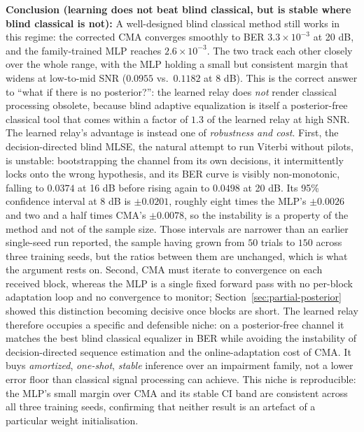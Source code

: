 \textbf{Conclusion (learning does not beat blind classical, but is stable where blind classical is not):} A well-designed blind classical method still works in this regime: the corrected CMA converges smoothly to BER $3.3\times10^{-3}$ at 20 dB, and the family-trained MLP reaches $2.6\times10^{-3}$. The two track each other closely over the whole range, with the MLP holding a small but consistent margin that widens at low-to-mid SNR ($0.0955$ vs.\ $0.1182$ at 8 dB). This is the correct answer to ``what if there is no posterior?'': the learned relay does \emph{not} render classical processing obsolete, because blind adaptive equalization is itself a posterior-free classical tool that comes within a factor of $1.3$ of the learned relay at high SNR. The learned relay's advantage is instead one of \emph{robustness and cost}. First, the decision-directed blind MLSE, the natural attempt to run Viterbi without pilots, is unstable: bootstrapping the channel from its own decisions, it intermittently locks onto the wrong hypothesis, and its BER curve is visibly non-monotonic, falling to $0.0374$ at 16 dB before rising again to $0.0498$ at 20 dB. Its 95\% confidence interval at 8 dB is $\pm0.0201$, roughly eight times the MLP's $\pm0.0026$ and two and a half times CMA's $\pm0.0078$, so the instability is a property of the method and not of the sample size. Those intervals are narrower than an earlier single-seed run reported, the sample having grown from $50$ trials to $150$ across three training seeds, but the ratios between them are unchanged, which is what the argument rests on. Second, CMA must iterate to convergence on each received block, whereas the MLP is a single fixed forward pass with no per-block adaptation loop and no convergence to monitor; Section~\ref{sec:partial-posterior} showed this distinction becoming decisive once blocks are short. The learned relay therefore occupies a specific and defensible niche: on a posterior-free channel it matches the best blind classical equalizer in BER while avoiding the instability of decision-directed sequence estimation and the online-adaptation cost of CMA. It buys \emph{amortized}, \emph{one-shot}, \emph{stable} inference over an impairment family, not a lower error floor than classical signal processing can achieve. This niche is reproducible: the MLP's small margin over CMA and its stable CI band are consistent across all three training seeds, confirming that neither result is an artefact of a particular weight initialisation.

